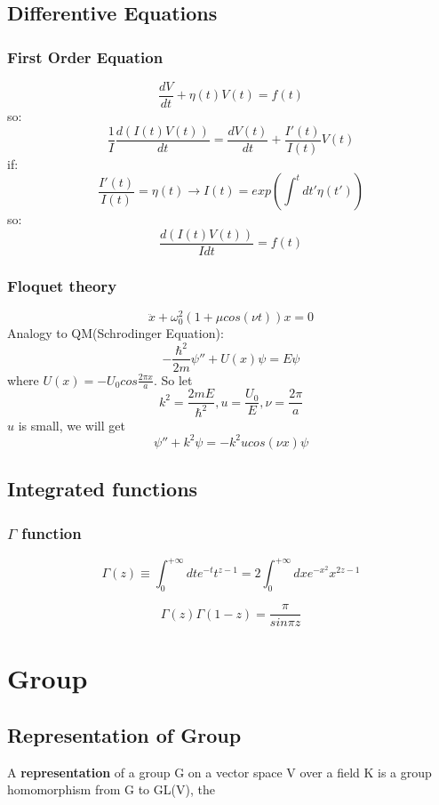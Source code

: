 \subsection{Differentive Equations}

\subsubsection{First Order Equation}
\[ 
\frac{dV}{dt} + \eta(t)V(t) = f(t)  
\]
so:
\[
    \frac{1}{I}\frac{d(I(t)V(t))}{dt} = \frac{dV(t)}{dt} + \frac{I'(t)}{I(t)}V(t)
    \]
if: 
\[ 
    \frac{I'(t)}{I(t)} = \eta(t)	\rightarrow I(t) = exp(\int^{t}dt'\eta(t'))
    \]
so:
\[ \frac{d(I(t)V(t))}{I dt} = f(t)\]

\subsubsection{Floquet theory}
\begin{equation}
    \ddot{x} + \omega_{0}^{2}(1+\mu cos(\nu t))x = 0
\end{equation}
Analogy to QM(Schrodinger Equation):	
\[
    -\frac{\hbar^{2}}{2m}{\psi''} + U(x)\psi = E\psi
    \]
where $U(x) = -U_{0}cos\frac{2\pi x}{a}$.
So let 
\[
    k^{2} = \frac{2mE}{\hbar^{2}}, u=\frac{U_0}{E}, \nu=\frac{2\pi}{a}
    \]
$u$ is small, we will get   
\[ 
    \psi''+k^{2}\psi = -k^{2}ucos(\nu x)\psi
    \]

\subsection{Integrated functions}
\subsubsection{$\Gamma$ function}
\[\Gamma(z) \equiv \int_{0}^{+\infty}dt e^{-t} t^{z-1} =
2\int_{0}^{+\infty}dx e^{-x^2}x^{2z-1}\]

\[\Gamma(z)\Gamma(1-z) = \frac{\pi}{sin\pi z}\]

\section{Group}

\subsection{Representation of Group}
A \textbf{representation} of a group G on a vector space V over a field K is
a group homomorphism from G to GL(V), the 
